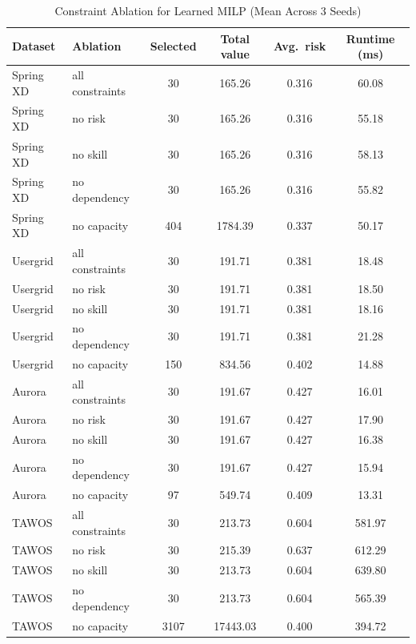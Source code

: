 \documentclass[conference]{IEEEtran}
\begin{document}
\begin{table}[t]
	\caption{Constraint Ablation for Learned MILP (Mean Across 3 Seeds)}
	\label{tab:planning-scenarios}
	\centering\scriptsize
	\begin{tabular}{llcccc}
		\toprule
		Dataset   & Ablation        & Selected & Total value & Avg.\ risk & Runtime (ms) \\
		\midrule
		Spring XD & all constraints & 30       & 165.26      & 0.316      & 60.08        \\
		Spring XD & no risk         & 30       & 165.26      & 0.316      & 55.18        \\
		Spring XD & no skill        & 30       & 165.26      & 0.316      & 58.13        \\
		Spring XD & no dependency   & 30       & 165.26      & 0.316      & 55.82        \\
		Spring XD & no capacity     & 404      & 1784.39     & 0.337      & 50.17        \\
		Usergrid  & all constraints & 30       & 191.71      & 0.381      & 18.48        \\
		Usergrid  & no risk         & 30       & 191.71      & 0.381      & 18.50        \\
		Usergrid  & no skill        & 30       & 191.71      & 0.381      & 18.16        \\
		Usergrid  & no dependency   & 30       & 191.71      & 0.381      & 21.28        \\
		Usergrid  & no capacity     & 150      & 834.56      & 0.402      & 14.88        \\
		Aurora    & all constraints & 30       & 191.67      & 0.427      & 16.01        \\
		Aurora    & no risk         & 30       & 191.67      & 0.427      & 17.90        \\
		Aurora    & no skill        & 30       & 191.67      & 0.427      & 16.38        \\
		Aurora    & no dependency   & 30       & 191.67      & 0.427      & 15.94        \\
		Aurora    & no capacity     & 97       & 549.74      & 0.409      & 13.31        \\
		TAWOS     & all constraints & 30       & 213.73      & 0.604      & 581.97       \\
		TAWOS     & no risk         & 30       & 215.39      & 0.637      & 612.29       \\
		TAWOS     & no skill        & 30       & 213.73      & 0.604      & 639.80       \\
		TAWOS     & no dependency   & 30       & 213.73      & 0.604      & 565.39       \\
		TAWOS     & no capacity     & 3107     & 17443.03    & 0.400      & 394.72       \\
		\bottomrule
	\end{tabular}
\end{table}
\end{document}
